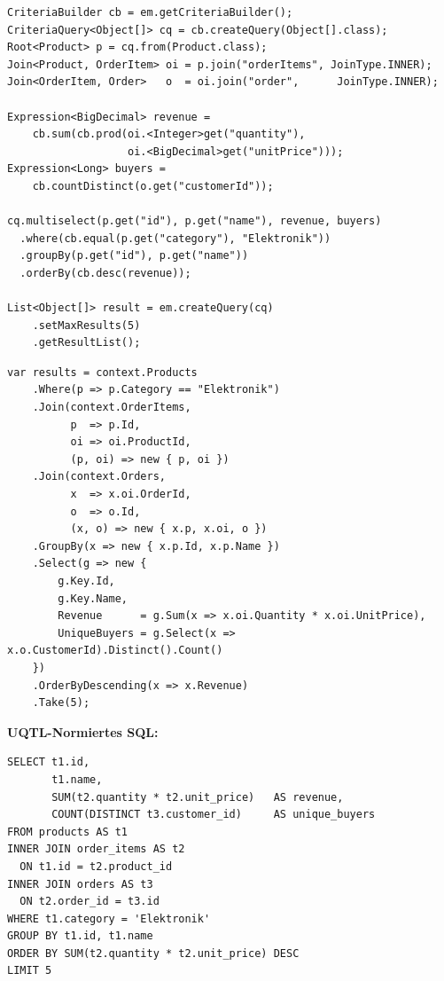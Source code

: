 \begin{lstlisting}[style=javastyle, caption={Beispiel 7 -- Java (Multi-Join + Aggregation)},
  label=lst:bsp7_java]
CriteriaBuilder cb = em.getCriteriaBuilder();
CriteriaQuery<Object[]> cq = cb.createQuery(Object[].class);
Root<Product> p = cq.from(Product.class);
Join<Product, OrderItem> oi = p.join("orderItems", JoinType.INNER);
Join<OrderItem, Order>   o  = oi.join("order",      JoinType.INNER);

Expression<BigDecimal> revenue =
    cb.sum(cb.prod(oi.<Integer>get("quantity"),
                   oi.<BigDecimal>get("unitPrice")));
Expression<Long> buyers =
    cb.countDistinct(o.get("customerId"));

cq.multiselect(p.get("id"), p.get("name"), revenue, buyers)
  .where(cb.equal(p.get("category"), "Elektronik"))
  .groupBy(p.get("id"), p.get("name"))
  .orderBy(cb.desc(revenue));

List<Object[]> result = em.createQuery(cq)
    .setMaxResults(5)
    .getResultList();
\end{lstlisting}

\begin{lstlisting}[style=csharpstyle, caption={Beispiel 7 -- C\# (Multi-Join + Aggregation)},
  label=lst:bsp7_cs]
var results = context.Products
    .Where(p => p.Category == "Elektronik")
    .Join(context.OrderItems,
          p  => p.Id,
          oi => oi.ProductId,
          (p, oi) => new { p, oi })
    .Join(context.Orders,
          x  => x.oi.OrderId,
          o  => o.Id,
          (x, o) => new { x.p, x.oi, o })
    .GroupBy(x => new { x.p.Id, x.p.Name })
    .Select(g => new {
        g.Key.Id,
        g.Key.Name,
        Revenue      = g.Sum(x => x.oi.Quantity * x.oi.UnitPrice),
        UniqueBuyers = g.Select(x => x.o.CustomerId).Distinct().Count()
    })
    .OrderByDescending(x => x.Revenue)
    .Take(5);
\end{lstlisting}

\begin{successbox}
\textbf{UQTL-Normiertes SQL:}
\begin{lstlisting}[style=sqlstyle, numbers=none]
SELECT t1.id,
       t1.name,
       SUM(t2.quantity * t2.unit_price)   AS revenue,
       COUNT(DISTINCT t3.customer_id)     AS unique_buyers
FROM products AS t1
INNER JOIN order_items AS t2
  ON t1.id = t2.product_id
INNER JOIN orders AS t3
  ON t2.order_id = t3.id
WHERE t1.category = 'Elektronik'
GROUP BY t1.id, t1.name
ORDER BY SUM(t2.quantity * t2.unit_price) DESC
LIMIT 5
\end{lstlisting}
\end{successbox}

